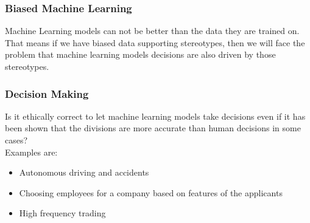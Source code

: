 \subsubsection*{Biased Machine Learning}

Machine Learning models can not be better than the data they are trained on. That means if we have biased data supporting stereotypes, then we will face the problem that machine learning models decisions are also driven by those stereotypes.

\subsubsection*{Decision Making}

Is it ethically correct to let machine learning models take decisions even if it has been shown that the divisions are more accurate than human decisions in some cases?\\
Examples are:

\begin{itemize}
    \item Autonomous driving and accidents
    \item Choosing employees for a company based on features of the applicants
    \item High frequency trading
\end{itemize}